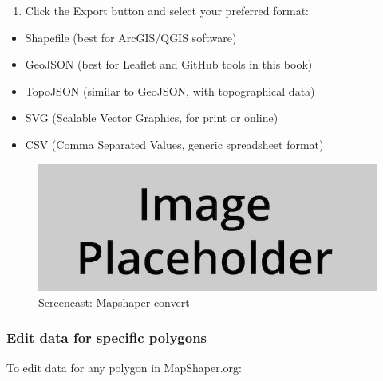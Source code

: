 \documentclass[
  english,
]{book}
\providecommand{\tightlist}{%
  \setlength{\itemsep}{0pt}\setlength{\parskip}{0pt}}
\begin{document}
\begin{enumerate}
\def\labelenumi{\arabic{enumi}.}
\setcounter{enumi}{1}
\tightlist
\item
  Click the Export button and select your preferred format:
\end{enumerate}

\begin{itemize}
\tightlist
\item
  Shapefile (best for ArcGIS/QGIS software)
\item
  GeoJSON (best for Leaflet and GitHub tools in this book)
\item
  TopoJSON (similar to GeoJSON, with topographical data)
\item
  SVG (Scalable Vector Graphics, for print or online)
\item
  CSV (Comma Separated Values, generic spreadsheet format)
\end{itemize}

\begin{figure}
\centering
\includegraphics{images/placeholder.jpg}
\caption{\label{fig:mapshaper-convert}Screencast: Mapshaper convert}
\end{figure}

\hypertarget{edit-data-for-specific-polygons}{%
\subsubsection*{Edit data for specific polygons}\label{edit-data-for-specific-polygons}}

To edit data for any polygon in MapShaper.org:
\end{document}
